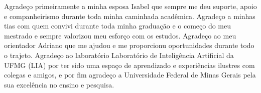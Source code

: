 Agradeço primeiramente a minha esposa Isabel que sempre me deu suporte, apoio e companheirismo durante toda
minha caminhada acadêmica. Agradeço a minhas tias com quem convivi durante toda minha graduação e o
começo do meu mestrado e sempre valorizou meu esforço com os estudos. Agradeço ao meu orientador
Adriano que me ajudou e me proporcionu oportunidades durante todo o trajeto. Agradeço ao laboratório
Laboratório de Inteligência Artificial da UFMG (LIA) por ter sido uma espaço de aprendizado e
experiências ilustres com colegas e amigos, e por fim agradeço a Universidade Federal de Minas
Gerais pela sua excelência no ensino e pesquisa.

